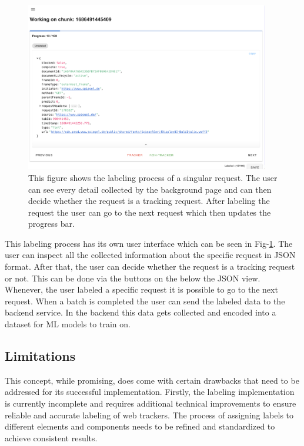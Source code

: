 \begin{figure}
  \begin{center}
    \includegraphics[width=0.95\textwidth]{images/Labeling.png}
  \end{center}
  \caption{This figure shows the labeling process of a singular request. The user can see every detail collected by the 
  background page and can then decide whether the request is a tracking request. After labeling the request the user can 
  go to the next request which then updates the progress bar.
}
  \label{fig:Labeling}
\end{figure}


This labeling process has its own user interface which can be seen in Fig-\ref{fig:Labeling}. The user can inspect all the collected information
about the specific request in JSON format. After that, the user can decide whether the request is a tracking request or not. This can be done via 
the buttons on the below the JSON view. Whenever, the user labeled a specific request it is possible to go to the next request. When a batch is
completed the user can send the labeled data to the backend service. In the backend this data gets collected and encoded into a dataset for ML
models to train on. 

\subsection{Limitations}
\label{sec:lim}

This concept, while promising, does come with certain drawbacks that need to be addressed for its successful implementation.
Firstly, the labeling implementation is currently incomplete and requires additional technical improvements to ensure reliable
and accurate labeling of web trackers. The process of assigning labels to different elements and components needs to be refined
and standardized to achieve consistent results.

